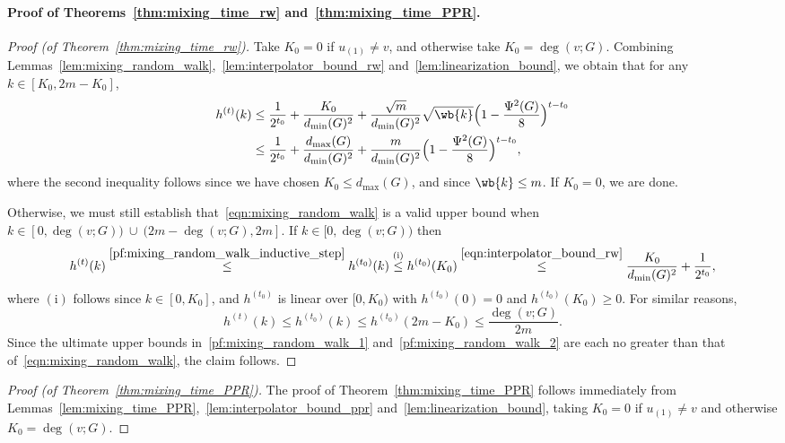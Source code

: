 \documentclass{article}
\newcommand{\1}{\mathbf{1}}
\theoremstyle{definition}
\theoremstyle{remark}
\begin{document}
\paragraph{Proof of Theorems~\ref{thm:mixing_time_rw} and~\ref{thm:mixing_time_PPR}.}
\begin{proof}[Proof (of Theorem~\ref{thm:mixing_time_rw})]
	Take $K_0 = 0$ if $u_{(1)} \neq v$, and otherwise take $K_0 = \deg(v;G)$. Combining Lemmas~\ref{lem:mixing_random_walk},~\ref{lem:interpolator_bound_rw} and~\ref{lem:linearization_bound}, we obtain that for any $k \in [K_0,2m - K_0]$, 
	\begin{align*}
	h^{(t)}(k) & \leq \frac{1}{2^{t_0}} + \frac{K_0}{d_{\min}(G)^2}  + \frac{\sqrt{m}}{d_{\min}(G)^2} \sqrt{\wb{k}} \Bigl(1 - \frac{\Psi^2(G)}{8}\Bigr)^{t-t_0} \\
	& \leq \frac{1}{2^{t_0}} + \frac{d_{\max}(G)}{d_{\min}(G)^2}  + \frac{m}{d_{\min}(G)^2} \Bigl(1 - \frac{\Psi^2(G)}{8}\Bigr)^{t-t_0},
	\end{align*}
	where the second inequality follows since we have chosen $K_0 \leq d_{\max}(G)$, and since $\wb{k} \leq m$. If $K_0 = 0$, we are done. 
	
	Otherwise, we must still establish that~\eqref{eqn:mixing_random_walk} is a valid upper bound when $k \in [0, \deg(v;G)) ~\cup~ (2m - \deg(v;G),2m]$. If $k \in [0, \deg(v;G))$ then
	\begin{equation}
	\label{pf:mixing_random_walk_1}
	h^{(t)}(k) \overset{\eqref{pf:mixing_random_walk_inductive_step}}{\leq} h^{(t_0)}(k) \overset{(\textrm{i})}{\leq} h^{(t_0)}(K_0) \overset{\eqref{eqn:interpolator_bound_rw}}{\leq} \frac{K_0}{d_{\min}(G)^2} + \frac{1}{2^{t_0}},
	\end{equation}
	where $(\textrm{i})$ follows since $k \in [0,K_0]$, and $h^{(t_0)}$ is linear over $[0,K_0)$ with $h^{(t_0)}(0) = 0$ and $h^{(t_0)}(K_0) \geq 0$. For similar reasons,
	\begin{equation}
	\label{pf:mixing_random_walk_2}
	h^{(t)}(k) \leq h^{(t_0)}(k) \leq h^{(t_0)}(2m - K_0) \leq \frac{\deg(v;G)}{2m}.
	\end{equation}
	Since the ultimate upper bounds in~\eqref{pf:mixing_random_walk_1} and~\eqref{pf:mixing_random_walk_2} are each no greater than that of~\eqref{eqn:mixing_random_walk}, the claim follows.
\end{proof}

\begin{proof}[Proof (of Theorem~\ref{thm:mixing_time_PPR})]
	The proof of Theorem~\ref{thm:mixing_time_PPR} follows immediately from Lemmas~\ref{lem:mixing_time_PPR},~\ref{lem:interpolator_bound_ppr} and~\ref{lem:linearization_bound}, taking $K_0 = 0$ if $u_{(1)} \neq v$ and otherwise $K_0 = \deg(v;G)$. 
\end{proof}
\end{document}
